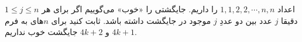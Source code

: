 \EXERCISE
اعداد
$1, 1, 2, 2, \cdots, n, n$
را داریم. جایگشتی را «خوب» می‌گوییم اگر برای هر
$1 \leq j \leq n$
دقیقا
$j$
عدد بین دو عددِ
$j$
موجود در جایگشت داشته باشد. ثابت کنید برای $n$های به فرم
$4k + 1$
و
$4k + 2$
جایگشت خوب نداریم.